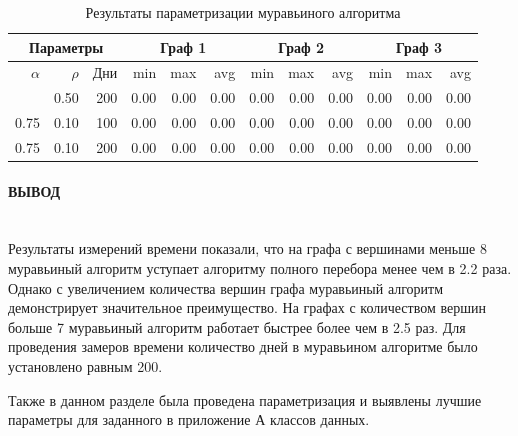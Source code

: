 \begin{longtable}{|r|r|r|r|r|r|r|r|r|r|r|r|}
\caption{Результаты параметризации муравьиного алгоритма}\label{tbl:param}
\\ \hline
\multicolumn{3}{|c|}{Параметры} & \multicolumn{3}{|c|}{Граф 1} & \multicolumn{3}{|c|}{Граф 2} & \multicolumn{3}{|c|}{Граф 3} \\
\hline
$\alpha$ & $\rho$ & Дни & min & max & avg & min & max & avg & min & max & avg \\
\hline
\endfirsthead
\hline
\endhead
\hline
\endfoot
\endlastfoot
\hline
0.50 & 0.50 & 200 & 0.00 & 0.00 & 0.00 & 0.00 & 0.00 & 0.00 & 0.00 & 0.00 & 0.00  \\
\hline
0.75 & 0.10 & 100 & 0.00 & 0.00 & 0.00 & 0.00 & 0.00 & 0.00 & 0.00 & 0.00 & 0.00  \\
0.75 & 0.10 & 200 & 0.00 & 0.00 & 0.00 & 0.00 & 0.00 & 0.00 & 0.00 & 0.00 & 0.00  \\
\hline
\end{longtable}


\paragraph*{ВЫВОД} ${}$ \\

Результаты измерений времени показали, что на графа с вершинами меньше 8 муравьиный алгоритм уступает алгоритму полного перебора менее чем в 2.2 раза. Однако с увеличением количества вершин графа муравьиный алгоритм демонстрирует значительное преимущество. На графах с количеством вершин больше 7 муравьиный алгоритм работает быстрее более чем в 2.5 раз. Для проведения замеров времени количество дней в муравьином алгоритме было установлено равным 200.

Также в данном разделе была проведена параметризация и выявлены лучшие параметры для заданного в приложение А классов данных.